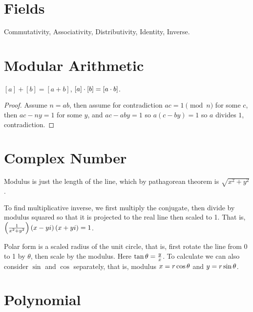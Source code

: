 \documentclass[11pt, cyan, night, 1in]{LatexTemplate/hw}
\begin{document}

\tableofcontents
\np

\section{Fields}

Commutativity, Associativity, Distributivity, Identity, Inverse.

\section{Modular Arithmetic}

$[a]+[b]=[a+b]$, $[a]\cdot[b]=[a\cdot b]$.


\begin{proof}
    Assume $n=ab$, then assume for contradiction $ac=1 \pmod n$ for some $c$, then $ac-ny=1$ for some $y$, and $ac-aby=1$ so $a(c-by)=1$ so $a$ divides $1$, contradiction.
\end{proof}



\section{Complex Number}

Modulus is just the length of the line, which by pathagorean theorem is $\sqrt{x^2+y^2}$.

To find multiplicative inverse, we first multiply the conjugate, then divide by modulus squared so that it is projected to the real line then scaled to 1. That is, $\left(\frac1{x^2+y^2}\right)\left(x-yi\right)\left(x+yi\right)=1$.

Polar form is a scaled radius of the unit circle, that is, first rotate the line from 0 to 1 by $\theta$, then scale by the modulus. Here $\tan\theta=\frac yx$. To calculate we can also consider $\sin$ and $\cos$ separately, that is, modulus $x=r\cos\theta$ and $y=r\sin\theta$.

\section{Polynomial}
\end{document}
